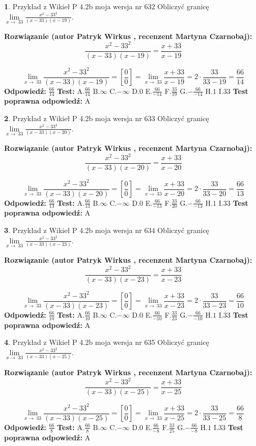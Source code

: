 \documentclass[12pt, a4paper]{article}
\theoremstyle{definition} %
\newtheorem{zad}{}
\newcommand{\zadStart}[1]{\begin{zad}#1\newline}
\newcommand{\zadStop}{\end{zad}}
\newcommand{\rozwStart}[2]{\noindent \textbf{Rozwiązanie (autor #1 , recenzent #2): }\newline}
\newcommand{\rozwStop}{\newline}
\newcommand{\odpStart}{\noindent \textbf{Odpowiedź:}\newline}
\newcommand{\odpStop}{\newline}
\newcommand{\testStart}{\noindent \textbf{Test:}\newline}
\newcommand{\testStop}{\newline}
\newcommand{\kluczStart}{\noindent \textbf{Test poprawna odpowiedź:}\newline}
\newcommand{\kluczStop}{\newline}
\begin{document}
\zadStart{Przykład z Wikieł P 4.2b moja wersja nr 632}
Obliczyć granicę $\lim\limits_{x\to\ 33}\frac{x^{2}-33^{2}}{(x-33)(x-19)}$.
\zadStop
\rozwStart{Patryk Wirkus}{Martyna Czarnobaj}
$$\frac{x^{2}-33^{2}}{(x-33)(x-19)}=\frac{x+33}{x-19}$$

$$\lim\limits_{x\to\ 33}\frac{x^{2}-33^{2}}{(x-33)(x-19)}=[\frac{0}{0}]=\lim\limits_{x\to\ 33}\frac{x+33}{x-19}=2 \cdot \frac{33}{33-19} = \frac{66}{14}$$
\rozwStop
\odpStart
$\frac{66}{14}$
\odpStop
\testStart
A.$\frac{66}{14}$
B.$\infty$
C.$-\infty$
D.$0$
E.$\frac{66}{-14}$
F.$\frac{33}{19}$
G.$-\frac{66}{-14}$
H.$1$
I.$33$
\testStop
\kluczStart
A
\kluczStop



\zadStart{Przykład z Wikieł P 4.2b moja wersja nr 633}
Obliczyć granicę $\lim\limits_{x\to\ 33}\frac{x^{2}-33^{2}}{(x-33)(x-20)}$.
\zadStop
\rozwStart{Patryk Wirkus}{Martyna Czarnobaj}
$$\frac{x^{2}-33^{2}}{(x-33)(x-20)}=\frac{x+33}{x-20}$$

$$\lim\limits_{x\to\ 33}\frac{x^{2}-33^{2}}{(x-33)(x-20)}=[\frac{0}{0}]=\lim\limits_{x\to\ 33}\frac{x+33}{x-20}=2 \cdot \frac{33}{33-20} = \frac{66}{13}$$
\rozwStop
\odpStart
$\frac{66}{13}$
\odpStop
\testStart
A.$\frac{66}{13}$
B.$\infty$
C.$-\infty$
D.$0$
E.$\frac{66}{-13}$
F.$\frac{33}{20}$
G.$-\frac{66}{-13}$
H.$1$
I.$33$
\testStop
\kluczStart
A
\kluczStop



\zadStart{Przykład z Wikieł P 4.2b moja wersja nr 634}
Obliczyć granicę $\lim\limits_{x\to\ 33}\frac{x^{2}-33^{2}}{(x-33)(x-23)}$.
\zadStop
\rozwStart{Patryk Wirkus}{Martyna Czarnobaj}
$$\frac{x^{2}-33^{2}}{(x-33)(x-23)}=\frac{x+33}{x-23}$$

$$\lim\limits_{x\to\ 33}\frac{x^{2}-33^{2}}{(x-33)(x-23)}=[\frac{0}{0}]=\lim\limits_{x\to\ 33}\frac{x+33}{x-23}=2 \cdot \frac{33}{33-23} = \frac{66}{10}$$
\rozwStop
\odpStart
$\frac{66}{10}$
\odpStop
\testStart
A.$\frac{66}{10}$
B.$\infty$
C.$-\infty$
D.$0$
E.$\frac{66}{-10}$
F.$\frac{33}{23}$
G.$-\frac{66}{-10}$
H.$1$
I.$33$
\testStop
\kluczStart
A
\kluczStop



\zadStart{Przykład z Wikieł P 4.2b moja wersja nr 635}
Obliczyć granicę $\lim\limits_{x\to\ 33}\frac{x^{2}-33^{2}}{(x-33)(x-25)}$.
\zadStop
\rozwStart{Patryk Wirkus}{Martyna Czarnobaj}
$$\frac{x^{2}-33^{2}}{(x-33)(x-25)}=\frac{x+33}{x-25}$$

$$\lim\limits_{x\to\ 33}\frac{x^{2}-33^{2}}{(x-33)(x-25)}=[\frac{0}{0}]=\lim\limits_{x\to\ 33}\frac{x+33}{x-25}=2 \cdot \frac{33}{33-25} = \frac{66}{8}$$
\rozwStop
\odpStart
$\frac{66}{8}$
\odpStop
\testStart
A.$\frac{66}{8}$
B.$\infty$
C.$-\infty$
D.$0$
E.$\frac{66}{-8}$
F.$\frac{33}{25}$
G.$-\frac{66}{-8}$
H.$1$
I.$33$
\testStop
\kluczStart
A
\kluczStop
\end{document}
